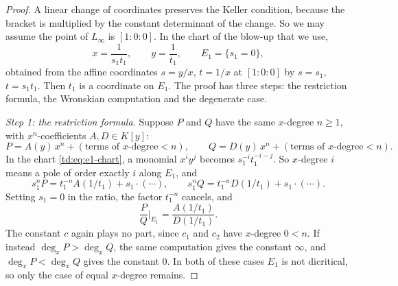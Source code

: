 \documentclass[a4paper,11pt]{article}
\theoremstyle{jsplain}
\theoremstyle{jsdef}
\theoremstyle{jsrem}
\begin{document}
\begin{proof}
A linear change of coordinates preserves the Keller condition, because the bracket is multiplied by
the constant determinant of the change. So we may assume the point of $L_\infty$ is $[1:0:0]$.
In the chart of the blow-up that we use,
\begin{equation}\label{td:eq:e1-chart}
x = \frac{1}{s_1 t_1}, \qquad y = \frac{1}{t_1}, \qquad E_1 = \{s_1 = 0\},
\end{equation}
obtained from the affine coordinates $s = y/x$, $t = 1/x$ at $[1:0:0]$ by $s = s_1$,
$t = s_1 t_1$. Then $t_1$ is a coordinate on $E_1$. The proof has three steps: the restriction
formula, the Wronskian computation and the degenerate case.

\emph{Step 1: the restriction formula.} Suppose $P$ and $Q$ have the same $x$-degree $n \geq 1$,
with $x^n$-coefficients $A, D \in K[y]$:
\begin{equation}\label{td:eq:lead-expansion}
P = A(y)\, x^n + (\text{terms of $x$-degree} < n), \qquad
Q = D(y)\, x^n + (\text{terms of $x$-degree} < n).
\end{equation}
In the chart \eqref{td:eq:e1-chart}, a monomial $x^i y^j$ becomes
$s_1^{-i} t_1^{-i-j}$. So $x$-degree $i$ means a pole of order exactly $i$ along $E_1$, and
\[
s_1^n P = t_1^{-n} A(1/t_1) + s_1 \cdot (\cdots), \qquad
s_1^n Q = t_1^{-n} D(1/t_1) + s_1 \cdot (\cdots).
\]
Setting $s_1 = 0$ in the ratio, the factor $t_1^{-n}$ cancels, and
\begin{equation}\label{td:eq:e1-restriction}
\frac{P}{Q}\bigg|_{E_1} = \frac{A(1/t_1)}{D(1/t_1)}.
\end{equation}
The constant $c$ again plays no part, since $c_1$ and $c_2$ have $x$-degree $0 < n$. If instead
$\deg_x P > \deg_x Q$, the same computation gives the constant $\infty$, and
$\deg_x P < \deg_x Q$ gives the constant $0$. In both of these cases $E_1$ is not dicritical, so
only the case of equal $x$-degree remains.


\end{proof}
\end{document}
